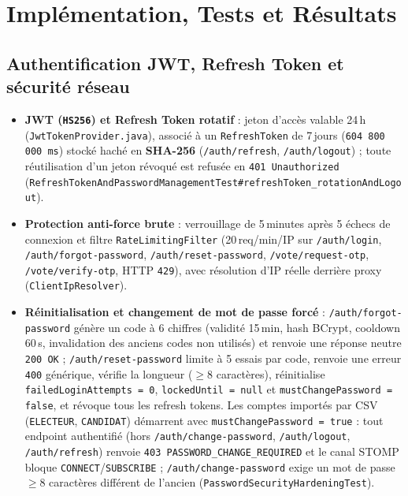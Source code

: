 \chapter{Implémentation, Tests et Résultats}
\label{chap:3}

\section{Authentification JWT, Refresh Token et sécurité réseau}

\begin{itemize}
    \item \textbf{JWT (\texttt{HS256}) et Refresh Token rotatif} : jeton d'accès valable 24\,h (\texttt{JwtTokenProvider.java}), associé à un \texttt{RefreshToken} de 7\,jours (\texttt{604\,800\,000\,ms}) stocké haché en \textbf{SHA-256} (\texttt{/auth/refresh}, \texttt{/auth/logout}) ; toute réutilisation d'un jeton révoqué est refusée en \texttt{401 Unauthorized} (\texttt{RefreshTokenAndPassword\allowbreak ManagementTest\#\allowbreak refreshToken\_rotationAndLogout}).
    \item \textbf{Protection anti-force brute} : verrouillage de 5\,minutes après 5 échecs de connexion et filtre \texttt{RateLimitingFilter} (20\,req/min/IP sur \texttt{/auth/login}, \texttt{/auth/forgot-password}, \texttt{/auth/reset-password}, \texttt{/vote/request-otp}, \texttt{/vote/verify-otp}, HTTP \texttt{429}), avec résolution d'IP réelle derrière proxy (\texttt{ClientIpResolver}).
    \item \textbf{Réinitialisation et changement de mot de passe forcé} : \texttt{/auth/forgot-password} génère un code à 6 chiffres (validité 15\,min, hash BCrypt, cooldown 60\,s, invalidation des anciens codes non utilisés) et renvoie une réponse neutre \texttt{200 OK} ; \texttt{/auth/reset-password} limite à 5 essais par code, renvoie une erreur \texttt{400} générique, vérifie la longueur ($\ge 8$ caractères), réinitialise \texttt{failedLoginAttempts = 0}, \texttt{lockedUntil = null} et \texttt{mustChangePassword = false}, et révoque tous les refresh tokens. Les comptes importés par CSV (\texttt{ELECTEUR}, \texttt{CANDIDAT}) démarrent avec \texttt{mustChangePassword = true} : tout endpoint authentifié (hors \texttt{/auth/change-password}, \texttt{/auth/logout}, \texttt{/auth/refresh}) renvoie \texttt{403 PASSWORD\_CHANGE\_REQUIRED} et le canal STOMP bloque \texttt{CONNECT}/\texttt{SUBSCRIBE} ; \texttt{/auth/change-password} exige un mot de passe $\ge 8$ caractères différent de l'ancien (\texttt{PasswordSecurityHardeningTest}).
\end{itemize}

